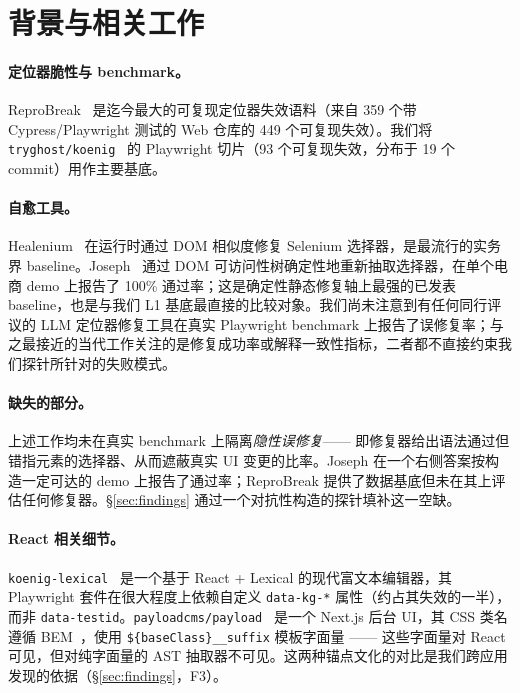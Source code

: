 \section{背景与相关工作}
\label{sec:background}

\paragraph{定位器脆性与 benchmark。}
ReproBreak~\cite{mouraReproBreak2026} 是迄今最大的可复现定位器失效语料（来自 359 个带 Cypress/Playwright 测试的 Web 仓库的 449 个可复现失效）。我们将 \texttt{tryghost/koenig}~\cite{koenig} 的 Playwright 切片（93 个可复现失效，分布于 19 个 commit）用作主要基底。

\paragraph{自愈工具。}
Healenium~\cite{healenium} 在运行时通过 DOM 相似度修复 Selenium 选择器，是最流行的实务界 baseline。Joseph~\cite{joseph2026zerocost} 通过 DOM 可访问性树确定性地重新抽取选择器，在单个电商 demo 上报告了 100\% 通过率；这是确定性静态修复轴上最强的已发表 baseline，也是与我们 L1 基底最直接的比较对象。我们尚未注意到有任何同行评议的 LLM 定位器修复工具在真实 Playwright benchmark 上报告了误修复率；与之最接近的当代工作关注的是修复成功率或解释一致性指标，二者都不直接约束我们探针所针对的失败模式。

\paragraph{缺失的部分。}
上述工作均未在真实 benchmark 上隔离\emph{隐性误修复}—— 即修复器给出语法通过但错指元素的选择器、从而遮蔽真实 UI 变更的比率。Joseph 在一个右侧答案按构造一定可达的 demo 上报告了通过率；ReproBreak 提供了数据基底但未在其上评估任何修复器。\S\ref{sec:findings} 通过一个对抗性构造的探针填补这一空缺。

\paragraph{React 相关细节。}
\texttt{koenig-lexical}~\cite{lexicalRichText, koenig} 是一个基于 React + Lexical 的现代富文本编辑器，其 Playwright 套件在很大程度上依赖自定义 \texttt{data-kg-*} 属性（约占其失效的一半），而非 \texttt{data-testid}。\texttt{payloadcms/payload}~\cite{payloadCMS} 是一个 Next.js 后台 UI，其 CSS 类名遵循 BEM~\cite{bemMethodology}，使用 \texttt{\$\{baseClass\}\_\_suffix} 模板字面量 —— 这些字面量对 React 可见，但对纯字面量的 AST 抽取器不可见。这两种锚点文化的对比是我们跨应用发现的依据（\S\ref{sec:findings}，F3）。
